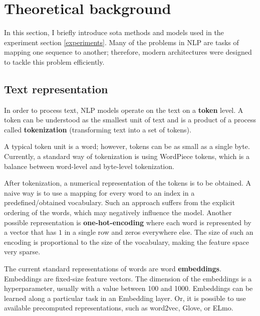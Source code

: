 \chapter{Theoretical background}\label{theory}
In this section, I briefly introduce \gls{sota} methods and models used in the experiment section \ref{experiments}. Many of the problems in NLP are tasks of mapping one sequence to another; therefore, modern architectures were designed to tackle this problem efficiently.




\section{Text representation}
In order to process text, NLP models operate on the text on a \textbf{token} level. A token can be understood as the smallest unit of text and is a product of a process called \textbf{tokenization} (transforming text into a set of tokens).

A typical token unit is a word; however, tokens can be as small as a single byte. Currently, a standard way of tokenization is using WordPiece tokens, which is a balance between word-level and byte-level tokenization.

After tokenization, a numerical representation of the tokens is to be obtained. A naive way is to use a mapping for every word to an index in a predefined/obtained vocabulary. Such an approach suffers from the explicit ordering of the words, which may negatively influence the model. Another possible representation is \textbf{one-hot-encoding} where each word is represented by a vector that has $1$ in a single row and zeros everywhere else. The size of such an encoding is proportional to the size of the vocabulary, making the feature space very sparse. 

The current standard representations of words are word \textbf{embeddings}. Embeddings are fixed-size feature vectors. The dimension of the embeddings is a hyperparameter, usually with a value between 100 and 1000. Embeddings can be learned along a particular task in an Embedding layer. Or, it is possible to use available precomputed representations, such as word2vec, Glove, or ELmo.
\newpage





